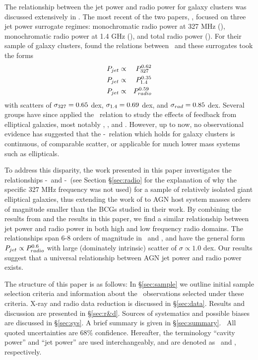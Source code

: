 \documentclass{emulateapj}
\begin{document}
The relationship between the jet power and radio power for galaxy
clusters was discussed extensively in \citet{birzan04, birzan08}. The
most recent of the two papers, \citet{birzan08}, focused on three jet
power surrogate regimes: monochromatic radio power at 327 MHz
(\pthree), monochromatic radio power at 1.4 GHz (\phigh), and total
radio power (\prad). For their sample of galaxy clusters,
\citet{birzan08} found the relations between \pjet\ and these
surrogates took the forms
\begin{eqnarray}
P_{jet} &\propto& P_{\mathrm{327}}^{0.62}\\
P_{jet} &\propto& P_{\mathrm{1.4}}^{0.35}\\
P_{jet} &\propto& P_{radio}^{0.59}
\end{eqnarray}
with scatters of $\sigma_{\mathrm{327}} = 0.65$ dex, $\sigma_{\mathrm{1.4}} = 0.69$ dex, and $\sigma_{rad}
= 0.85$ dex. Several groups have since applied the \birzan\ relation
to study the effects of feedback from elliptical galaxies, most
notably \citet{best07}, \citet{2007MNRAS.379..260M}, and
\citet{2009arXiv0908.3158H}. However, up to now, no observational
evidence has suggested that the \pjet-\prad\ relation which holds for
galaxy clusters is continuous, of comparable scatter, or applicable
for much lower mass systems such as ellipticals.

To address this disparity, the work presented in this paper
investigates the relationships \pjet-\phigh\ and \pjet-\plow\ (see
Section \S\ref{sec:radio} for the explanation of why the specific 327
MHz frequency was not used) for a sample of relatively isolated giant
elliptical galaxies, thus extending the work of \citet{birzan08} to
AGN host system masses orders of magnitude smaller than the BCGs
studied in their work. By combining the results from \citet{birzan08}
and the results in this paper, we find a similar relationship between
jet power and radio power in both high and low frequency radio
domains. The relationships span 6-8 orders of magnitude in \pjet\ and
\prad, and have the general form $P_{jet} \propto P_{radio}^{0.6}$ with
large (dominately intrinsic) scatter of $\sigma \propto 1.0$ dex. Our
results suggest that a universal relationship between AGN jet power
and radio power exists.

The structure of this paper is as follows: In \S\ref{sec:sample} we
outline initial sample selection criteria and information about the
\chandra\ observations selected under these criteria. X-ray and radio
data reduction is discussed in \S\ref{sec:data}. Results and
discussion are presented in \S\ref{sec:r&d}. Sources of systematics
and possible biases are discussed in \S\ref{sec:sys}. A brief summary
is given in \S\ref{sec:summary}. \LCDM\ All quoted uncertainties are
68\% confidence. Hereafter, the terminology ``cavity power'' and ``jet
power'' are used interchangeably, and are denoted as \pcav\ and \pjet,
respectively.
\end{document}

